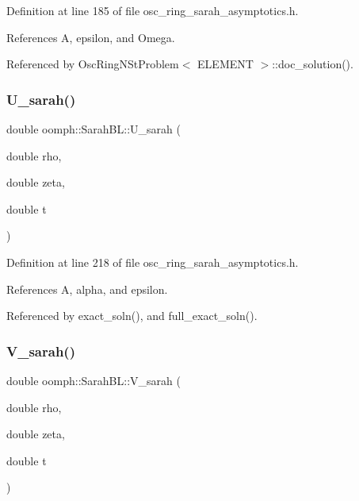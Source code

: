 Definition at line 185 of file osc\+\_\+ring\+\_\+sarah\+\_\+asymptotics.\+h.



References A, epsilon, and Omega.



Referenced by Osc\+Ring\+N\+St\+Problem$<$ E\+L\+E\+M\+E\+N\+T $>$\+::doc\+\_\+solution().

\mbox{\label{namespaceoomph_1_1SarahBL_a702395898e24e2ff65f724a79b88f63b}} 
\subsubsection{\texorpdfstring{U\+\_\+sarah()}{U\_sarah()}}
{\footnotesize\ttfamily double oomph\+::\+Sarah\+B\+L\+::\+U\+\_\+sarah (\begin{DoxyParamCaption}\item[{double}]{rho,  }\item[{double}]{zeta,  }\item[{double}]{t }\end{DoxyParamCaption})}



Definition at line 218 of file osc\+\_\+ring\+\_\+sarah\+\_\+asymptotics.\+h.



References A, alpha, and epsilon.



Referenced by exact\+\_\+soln(), and full\+\_\+exact\+\_\+soln().

\mbox{\label{namespaceoomph_1_1SarahBL_afe2672fb083e5cd566f80d7a0f20df94}} 
\subsubsection{\texorpdfstring{V\+\_\+sarah()}{V\_sarah()}}
{\footnotesize\ttfamily double oomph\+::\+Sarah\+B\+L\+::\+V\+\_\+sarah (\begin{DoxyParamCaption}\item[{double}]{rho,  }\item[{double}]{zeta,  }\item[{double}]{t }\end{DoxyParamCaption})}



